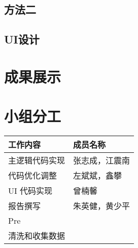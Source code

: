 \documentclass[12pt,hyperref,a4paper,UTF8]{ctexart}
\begin{document}
\subsection{方法二}
\subsection{UI设计}

\section{成果展示}

\section{小组分工}
\begin{longtable}{>{\centering\arraybackslash}p{} >{\centering\arraybackslash}p{}} %
    \toprule
    \textbf{工作内容} & \textbf{成员名称} \\ %
    \midrule
    主逻辑代码实现 & 张志成，江震南 \\
    代码优化调整 & 左斌斌，鑫攀​ \\
    UI 代码实现 & 曾楠馨 \\
    报告撰写 & 朱英健，黄少平 \\
    Pre &  \\
    清洗和收集数据 &  \\
    \bottomrule
\end{longtable}


\end{document}
